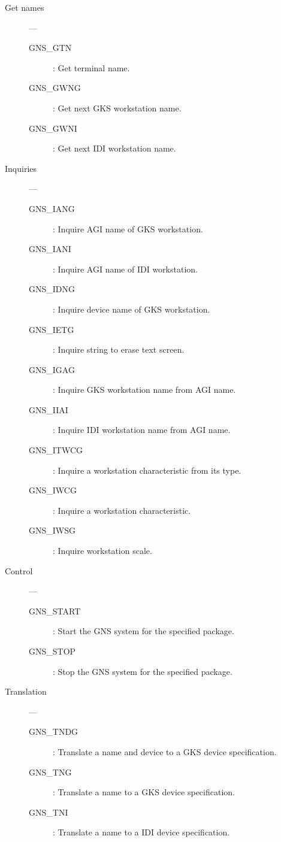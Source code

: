 \begin{description}

\item [Get names] ---

\begin{description}
\item [GNS\_GTN] : Get terminal name.
\item [GNS\_GWNG] : Get next GKS workstation name.
\item [GNS\_GWNI] : Get next IDI workstation name.
\end{description}

\item [Inquiries] ---

\begin{description}
\item [GNS\_IANG] : Inquire AGI name of GKS workstation.
\item [GNS\_IANI] : Inquire AGI name of IDI workstation.
\item [GNS\_IDNG] : Inquire device name of GKS workstation.
\item [GNS\_IETG] : Inquire string to erase text screen.
\item [GNS\_IGAG] : Inquire GKS workstation name from AGI name.
\item [GNS\_IIAI] : Inquire IDI workstation name from AGI name.
\item [GNS\_ITWCG] : Inquire a workstation characteristic from its type.
\item [GNS\_IWCG] : Inquire a workstation characteristic.
\item [GNS\_IWSG] : Inquire workstation scale.
\end{description}

\item [Control] ---

\begin{description}
\item [GNS\_START] : Start the GNS system for the specified package.
\item [GNS\_STOP] : Stop the GNS system for the specified package.
\end{description}

\item [Translation] ---

\begin{description}
\item [GNS\_TNDG] : Translate a name and device to a GKS device specification.
\item [GNS\_TNG] : Translate a name to a GKS device specification.
\item [GNS\_TNI] : Translate a name to a IDI device specification.
\end{description}

\end{description}

